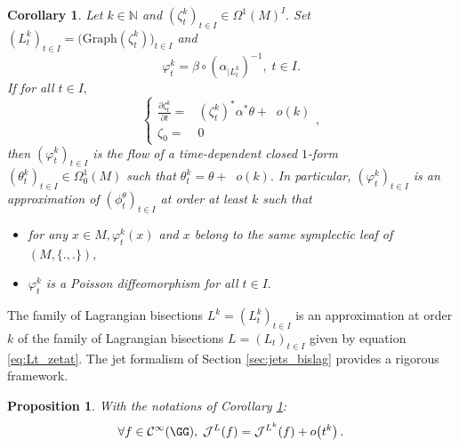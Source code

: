 \documentclass[a4paper,11pt]{article}
\newcommand{\Graph}{\text{Graph}}
\newcommand{\smallO}[1]{\ensuremath{\mathop{}\mathopen{}o\mathopen{}\left(#1\right)}}
\newcommand{\func}[1]{\mathcal{C}^{\infty}(#1)}
\newtheorem{proposition}[theorem]{Proposition}
\newtheorem{corollary}[theorem]{Corollary}
\begin{document}
\begin{corollary}\label{cor:Ham_jac_k}
Let $k \in \mathbb{N}$ and $(\zeta_t^{k})_{t \in I} \in \Omega^1(M)^{I}.$ Set $(L_t^{k})_{t \in I} = \bigl(\Graph(\zeta_t^{k}) \bigr)_{t \in I}$ and
\[
\varphi_t^{k} = \beta \circ (\alpha_{|L_t^{k}})^{-1}, \; t \in I.
\]
If for all $t \in I,$ 
\[
\left\{
\begin{array}{cc}
\frac{\partial \zeta_t^k}{\partial t} =& (\zeta_t^k)^*\alpha^*\theta + \smallO{k}\\
\zeta_0 =& 0
\end{array}
\right.,
\]
then $(\varphi_t^k)_{t \in I}$ is the flow of a time-dependent closed $1$-form $(\theta^k_t)_{t \in I} \in \Omega^1_0(M)$ such that $\theta^k_t = \theta + \smallO{k}.$ In particular, $(\varphi_t^k)_{t \in I}$ is an approximation of $(\phi^{\theta}_t)_{t \in I}$ at order at least $k$ such that
\begin{itemize}
\item for any $x \in M, \varphi_t^k(x)$ and $x$ belong to the same symplectic leaf of $(M, \{.,.\}),$
\item $\varphi_t^k$ is a Poisson diffeomorphism for all $t \in I.$
\end{itemize}
\end{corollary}
The family of Lagrangian bisections $L^k = (L_t^{k})_{t \in I}$ is an approximation at order $k$ of the family of Lagrangian bisections $L = (L_t)_{t \in I}$ given by equation \eqref{eq:Lt_zetat}. The jet formalism of Section \ref{sec:jets_bislag} provides a rigorous framework.
\begin{proposition}
With the notations of Corollary \ref{cor:Ham_jac_k}:
\[
\forall f \in \func{\GG}, \; \mathcal{J}^L(f) = \mathcal{J}^{L^k}(f) + \smallO{t^k}.
\]
\end{proposition}
\end{document}
